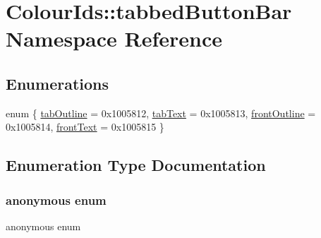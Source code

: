 \hypertarget{namespaceColourIds_1_1tabbedButtonBar}{}\section{Colour\+Ids\+:\+:tabbed\+Button\+Bar Namespace Reference}
\label{namespaceColourIds_1_1tabbedButtonBar}
\subsection*{Enumerations}
\begin{DoxyCompactItemize}
\item 
enum \{ \mbox{\hyperlink{namespaceColourIds_1_1tabbedButtonBar_ada0697e2539503d9d55bc9052a9ac6e4ac49cd09f64d664a383faf7198d70ebfb}{tab\+Outline}} = 0x1005812, 
\mbox{\hyperlink{namespaceColourIds_1_1tabbedButtonBar_ada0697e2539503d9d55bc9052a9ac6e4a32a1e322a31f72f20eda07e609572c12}{tab\+Text}} = 0x1005813, 
\mbox{\hyperlink{namespaceColourIds_1_1tabbedButtonBar_ada0697e2539503d9d55bc9052a9ac6e4a6fefa9a37097366828b6296375a527c6}{front\+Outline}} = 0x1005814, 
\mbox{\hyperlink{namespaceColourIds_1_1tabbedButtonBar_ada0697e2539503d9d55bc9052a9ac6e4a279ea0481692bda6b244816de634f9b1}{front\+Text}} = 0x1005815
 \}
\end{DoxyCompactItemize}


\subsection{Enumeration Type Documentation}
\mbox{\label{namespaceColourIds_1_1tabbedButtonBar_ada0697e2539503d9d55bc9052a9ac6e4}} 
\subsubsection{\texorpdfstring{anonymous enum}{anonymous enum}}
{\footnotesize\ttfamily anonymous enum}

